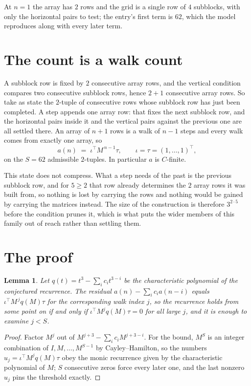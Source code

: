 \documentclass[11pt,a4paper]{article}
\theoremstyle{plain}
\newtheorem{lemma}[theorem]{Lemma}
\theoremstyle{definition}
\begin{document}
At $n=1$ the array has $2$ rows and the grid is a single row of $4$
subblocks, with only the horizontal pairs to test; the entry's first term is
$62$, which the model reproduces along with every later term.

\section{The count is a walk count}

A subblock row is fixed by $2$ consecutive array rows, and the vertical condition compares
two consecutive subblock rows, hence $2+1$ consecutive array rows. So take as state the
$2$-tuple of consecutive rows whose subblock row has just been completed. A step appends one
array row: that fixes the next subblock row, and the horizontal pairs inside it and the
vertical pairs against the previous one are all settled there. An array of $n+1$ rows is
a walk of $n-1$ steps and every walk comes from exactly one array, so
\[
a(n)\;=\;\iota^{\!\top}M^{\,n-1}\tau,\qquad\iota=\tau=(1,\dots,1)^{\!\top},
\]
on the $S=62$ admissible $2$-tuples. In particular $a$ is $C$-finite.

This state does not compress. What a step needs of the past is the previous subblock row, and
for $5\ge2$ that row already determines the $2$ array rows it was built from, so nothing
is lost by carrying the rows and nothing would be gained by carrying the matrices instead. The
size of the construction is therefore $3^{2\cdot5}$ before the condition prunes
it, which is what puts the wider members of this family out of reach rather than settling them.

\section{The proof}

\begin{lemma}\label{lem:crit}
Let $q(t)=t^{3}-\sum_i c_it^{3-i}$ be the characteristic polynomial of the
conjectured recurrence. The residual $a(n)-\sum_ic_ia(n-i)$ equals
$\iota^{\!\top}M^{\,j}q(M)\tau$ for the corresponding walk index $j$, so the recurrence
holds from some point on if and only if $\iota^{\!\top}M^{j}q(M)\tau=0$ for all large $j$,
and it is enough to examine $j<S$.
\end{lemma}

\begin{proof}
Factor $M^{j}$ out of $M^{j+3}-\sum_ic_iM^{j+3-i}$. For the bound, $M^{S}$
is an integer combination of $I,M,\dots,M^{S-1}$ by Cayley--Hamilton, so the numbers
$u_j=\iota^{\!\top}M^{j}q(M)\tau$ obey the monic recurrence given by the characteristic
polynomial of $M$; $S$ consecutive zeros force every later one, and the last nonzero $u_j$
pins the threshold exactly.
\end{proof}
\end{document}
